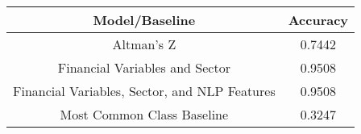 \footnotesize
\begin{tabular}{cc}
\toprule
Model/Baseline & Accuracy \\
\midrule
Altman's Z & 0.7442 \\
Financial Variables and Sector & 0.9508 \\
Financial Variables, Sector, and NLP Features & 0.9508 \\
Most Common Class Baseline & 0.3247 \\
\bottomrule
\end{tabular}

\normalsize